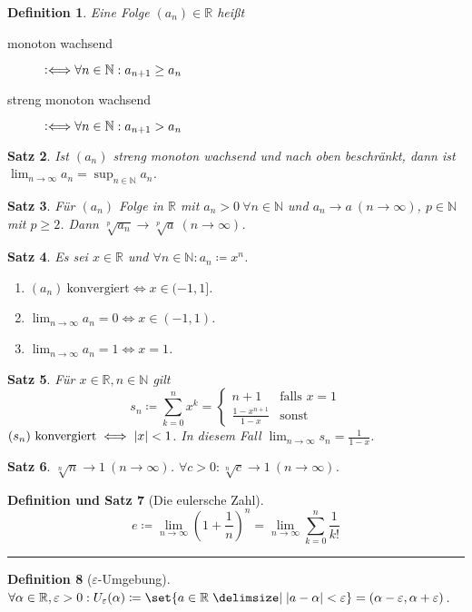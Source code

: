 \documentclass[a4paper]{article}
\newcounter{Sec}
\theoremstyle{marginbreak}
\newtheorem{definition}{Definition}[Sec]
\newtheorem{satz}[definition]{Satz}
\newtheorem{defsatz}[definition]{Definition und Satz}
\newcommand{\sep}{%
	\rule{\textwidth}{0.3pt}%
	\stepcounter{Sec}%
	}
\newcommand{\defiff}{\mathrel{\vcentcolon\Longleftrightarrow}}
\newcommand{\en}{~(n\to\infty)}
\begin{document}
	\begin{definition}
		Eine Folge $(a_n)\in\mathbb{R}$ heißt
		\begin{description}
			\item[monoton wachsend] $\defiff\forall n\in\mathbb{N}:a_{n+1}\geq a_n$
			\item[streng monoton wachsend] $\defiff\forall n\in\mathbb{N}:a_{n+1}>a_n$
		\end{description}
	\end{definition}
	\begin{satz}
		Ist $(a_n)$ streng monoton wachsend und nach oben beschränkt, dann ist $\lim_{n\to\infty} a_n=\sup_{n\in\mathbb{N}}a_n$.
	\end{satz}
	\begin{satz}
		Für $(a_n)$ Folge in $\mathbb{R}$ mit $a_n>0~\forall n\in\mathbb{N}$ und $a_n\to a\en$,
		$p\in\mathbb{N}$ mit $p\geq2$. Dann $\sqrt[p]{a_n}\to\sqrt[p]{a}\en$.
	\end{satz}
	\begin{satz}
		Es sei $x\in\mathbb{R}$ und $\forall n\in\mathbb{N}:a_n\coloneqq x^n$.
		\begin{enumerate}[label=(\alph*)]
			\item $(a_n)~\text{konvergiert}\iff x\in(-1,1]$.
			\item $\lim_{n\to\infty}a_n=0\iff x\in(-1,1)$.
			\item $\lim_{n\to\infty}a_n=1\iff x =1$.
		\end{enumerate}
	\end{satz}
	\begin{satz}
		Für $x\in\mathbb{R},n\in\mathbb{N}$ gilt \[s_n\coloneqq\sum_{k=0}^nx^k=\begin{cases}
			n+1 &\text{falls $x=1$}\\
			\frac{1-x^{n+1}}{1-x} &\text{sonst}
		\end{cases}\]
		$(s_n)~\text{konvergiert}\iff\abs{x}<1$. In diesem Fall $\lim_{n\to\infty}s_n=\frac{1}{1-x}$.
	\end{satz}
	\begin{satz}
		$\sqrt[n]{n}\to1\en$. $\forall c>0:\sqrt[n]{c}\to1\en$.
	\end{satz}
	\begin{defsatz}[Die eulersche Zahl]
		\[ e\coloneqq \lim_{n\to\infty}(1+\frac{1}{n})^n = \lim_{n\to\infty}\sum_{k=0}^n\frac{1}{k!}\]
	\end{defsatz}
	\sep
	\begin{definition}[$\varepsilon$-Umgebung]
		$\forall\alpha\in\mathbb{R},\varepsilon>0:U_\varepsilon(\alpha)\coloneqq\set{a\in\mathbb{R}\given\abs{a-\alpha}<\varepsilon}
		=(\alpha-\varepsilon,\alpha+\varepsilon)$.
	\end{definition}
\end{document}
